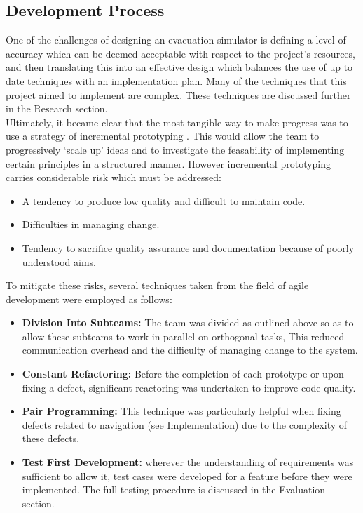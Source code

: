 \subsection{Development Process}
\label{Team:subsec:process}
One of the challenges of designing an evacuation simulator is defining a level of accuracy which can be deemed acceptable with respect to the project's resources, and then translating this into an effective design which balances the use of up to date techniques with an implementation plan. Many of the techniques that this project aimed to implement are complex. These techniques are discussed further in the Research section.\\
Ultimately, it became clear that the most tangible way to make progress was to use a strategy of incremental prototyping \cite[Ch 2.3.2]{SommervilleSoftwareEng}. This would allow the team to progressively `scale up' ideas and to investigate the feasability of implementing certain principles in a structured manner. However incremental prototyping carries considerable risk which must be addressed:
\begin{itemize}
\item A tendency to produce low quality and difficult to maintain code.
\item Difficulties in managing change.
\item Tendency to sacrifice quality assurance and documentation because of poorly understood aims.
\end{itemize}

To mitigate these risks, several techniques taken from the field of agile development \cite[Ch. 3]{SommervilleSoftwareEng} were employed as follows:
\begin{itemize}
\item \textbf{Division Into Subteams:} The team was divided as outlined above so as to allow these subteams to work in parallel on orthogonal tasks, This reduced communication overhead and the difficulty of managing change to the system.
\item \textbf{Constant Refactoring:} Before the completion of each prototype or upon fixing a defect, significant reactoring was undertaken to improve code quality.
\item \textbf{Pair Programming:} This technique was particularly helpful when fixing defects related to navigation (see Implementation) due to the complexity of these defects.
\item \textbf{Test First Development:} wherever the understanding of requirements was sufficient to allow it, test cases were developed for a feature before they were implemented. The full testing procedure is discussed in the Evaluation section.
\end{itemize}

%
